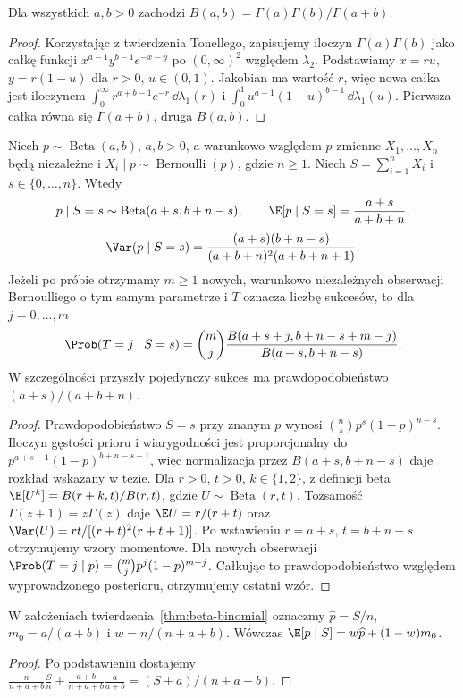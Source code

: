 \begin{lemat}
Dla wszystkich $a,b>0$ zachodzi
$B(a,b)=\Gamma(a)\Gamma(b)/\Gamma(a+b)$.
\end{lemat}
\begin{proof}
Korzystając z twierdzenia Tonellego, zapisujemy iloczyn
$\Gamma(a)\Gamma(b)$ jako całkę funkcji
$x^{a-1}y^{b-1}e^{-x-y}$ po $(0,\infty)^2$
względem $\lambda_2$. Podstawiamy $x=ru$, $y=r(1-u)$
dla $r>0$, $u\in(0,1)$. Jakobian ma wartość $r$,
więc nowa całka jest iloczynem
$\int_0^\infty r^{a+b-1}e^{-r}\,\dd\lambda_1(r)$
i $\int_0^1u^{a-1}(1-u)^{b-1}\,\dd\lambda_1(u)$.
Pierwsza całka równa się $\Gamma(a+b)$, druga $B(a,b)$.
\end{proof}

\begin{twierdzenie}
\label{thm:beta-binomial}
Niech $p\sim\operatorname{Beta}(a,b)$, $a,b>0$, a warunkowo
względem $p$ zmienne $X_1,\ldots,X_n$ będą niezależne
i $X_i\mid p\sim\operatorname{Bernoulli}(p)$, gdzie $n\ge1$.
Niech $S=\sum_{i=1}^nX_i$ i $s\in\{0,\ldots,n\}$.
Wtedy
\[
 p\mid S=s\sim\operatorname{Beta}(a+s,b+n-s),\qquad
 \E[p\mid S=s]=\frac{a+s}{a+b+n},
\]
\[
 \Var(p\mid S=s)=\frac{(a+s)(b+n-s)}{(a+b+n)^2(a+b+n+1)}.
\]
Jeżeli po próbie otrzymamy $m\ge1$ nowych, warunkowo niezależnych
obserwacji Bernoulliego o tym samym parametrze i
$T$ oznacza liczbę sukcesów, to dla $j=0,\ldots,m$
\[
 \Prob(T=j\mid S=s)
 =\binom mj\frac{B(a+s+j,b+n-s+m-j)}{B(a+s,b+n-s)}.
\]
W szczególności przyszły pojedynczy sukces ma prawdopodobieństwo
$(a+s)/(a+b+n)$.
\end{twierdzenie}
\begin{proof}
Prawdopodobieństwo $S=s$ przy znanym $p$ wynosi
$\binom ns p^s(1-p)^{n-s}$. Iloczyn gęstości prioru i
wiarygodności jest proporcjonalny do
$p^{a+s-1}(1-p)^{b+n-s-1}$, więc normalizacja przez
$B(a+s,b+n-s)$ daje rozkład wskazany w tezie.
Dla $r>0$, $t>0$, $k\in\{1,2\}$, z definicji beta
$\E[U^k]=B(r+k,t)/B(r,t)$, gdzie
$U\sim\operatorname{Beta}(r,t)$. Tożsamość
$\Gamma(z+1)=z\Gamma(z)$ daje
$\E U=r/(r+t)$ oraz $\Var(U)=rt/[(r+t)^2(r+t+1)]$.
Po wstawieniu $r=a+s$, $t=b+n-s$ otrzymujemy wzory
momentowe. Dla nowych obserwacji
$\Prob(T=j\mid p)=\binom mjp^j(1-p)^{m-j}$.
Całkując to prawdopodobieństwo względem wyprowadzonego
posterioru, otrzymujemy ostatni wzór.
\end{proof}

\begin{stwierdzenie}
\label{prop:beta-shrinkage}
W założeniach twierdzenia~\ref{thm:beta-binomial} oznaczmy
$\widehat p=S/n$, $m_0=a/(a+b)$ i $w=n/(n+a+b)$.
Wówczas $\E[p\mid S]=w\widehat p+(1-w)m_0$.
\end{stwierdzenie}
\begin{proof}
Po podstawieniu dostajemy
$\frac{n}{n+a+b}\frac Sn+
\frac{a+b}{n+a+b}\frac{a}{a+b}=(S+a)/(n+a+b)$.
\end{proof}

